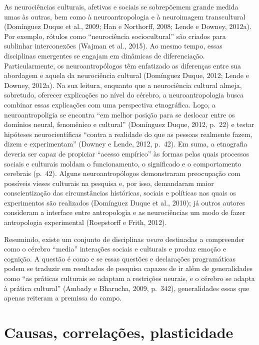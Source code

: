 As neurociências culturais, afetivas e sociais se sobrepõemem grande
medida umas às outras, bem como à neuroantropologia e à neuroimagem
transcultural (Domínguez Duque et al., 2009; Han e Northorff, 2008;
Lende e Downey, 2012a). Por exemplo, rótulos como ``neurociência
sociocultural'' são criados para sublinhar interconexões (Wajman et al.,
2015). Ao mesmo tempo, essas disciplinas emergentes se engajam em
dinâmicas de diferenciação. Particularmente, os neuroantropólogos têm
enfatizado as diferenças entre sua abordagem e aquela da neurociência
cultural (Domínguez Duque, 2012; Lende e Downey, 2012a). Na sua leitura,
enquanto que a neurociência cultural almeja, sobretudo, oferecer
explicações no nível do cérebro, a neuroantropologia busca combinar
essas explicações com uma perspectiva etnográfica. Logo, a
neuroantropoligia se encontra ``em melhor posição para se deslocar entre
os domínios neural, fenomênico e cultural'' (Domínguez Duque, 2012,
p.~22) e testar hipóteses neurocientíficas ``contra a realidade do que as
pessoas realmente fazem, dizem e experimentam'' (Downey e Lende, 2012,
p.~42). Em suma, a etnografia deveria ser capaz de propiciar ``acesso
empírico'' às formas pelas quais processos sociais e culturais moldam o
funcionamento, o significado e o comportamento cerebrais (p.~42). Alguns
neuroantropólogos demonstraram preocupação com possíveis vieses
culturais na pesquisa e, por isso, demandaram maior conscientização das
circunstâncias históricas, sociais e políticas nas quais os experimentos
são realizados (Domínguez Duque et al., 2010); já outros autores
consideram a interface entre antropologia e as neurociências um modo de
fazer antropologia experimental (Roepstorff e Frith, 2012).

Resumindo, existe um conjunto de disciplinas \emph{neuro} destinadas a
compreender como o cérebro ``media'' interações sociais e culturais e
produz emoção e cognição. A questão é como e se essas questões e
declarações programáticas podem se traduzir em resultados de pesquisa
capazes de ir além de generalidades como ``as práticas culturais se
adaptam a restrições neurais, e o cérebro se adapta à prática cultural''
(Ambady e Bharucha, 2009, p.~342), generalidades essas que apenas
reiteram a premissa do campo.

\section{Causas, correlações, plasticidade}

